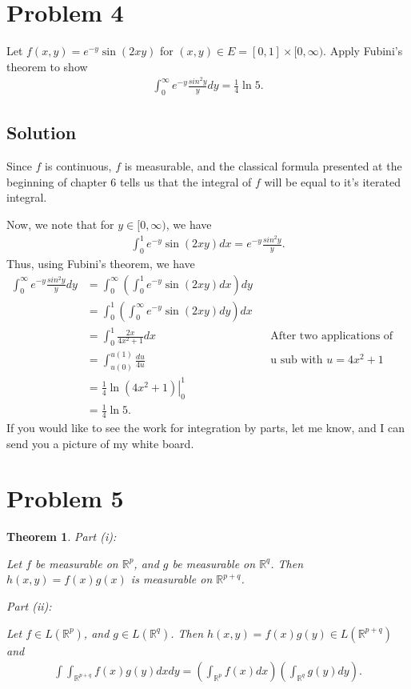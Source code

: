 \documentclass[10pt,a4paper]{article}
\makeatletter
\theoremstyle{theorem}
\newtheorem{theorem}{Theorem}
\newcommand{\proofpart}[2]{%
  \par
  \addvspace{\medskipamount}%
  \noindent\emph{Part #1: #2}\par\nobreak
  \addvspace{\smallskipamount}%
  \@afterheading
}
\theoremstyle{definition}
\makeatother
\begin{document}
\section*{Problem 4}
Let $f(x, y) = e^{-y} \sin(2xy)$ for $(x, y) \in E = [0, 1] \times [0, \infty)$. Apply Fubini's theorem to show
\begin{align*}
\int_0^\infty e^{-y} \frac{sin^2 y}{y} dy = \frac{1}{4} \ln 5.
\end{align*}

\subsection*{Solution}
Since $f$ is continuous, $f$ is measurable, and the classical formula presented at the beginning of chapter 6 tells us that the integral of $f$ will be equal to it's iterated integral.

Now, we note that for $y \in [0, \infty)$, we have
\begin{align*}
\int_0^1 e^{-y} \sin(2xy) dx = e^{-y} \frac{sin^2 y}{y}.
\end{align*}
Thus, using Fubini's theorem, we have
\begin{align*}
\int_0^\infty e^{-y} \frac{sin^2 y}{y} dy &= \int_0^\infty \left( \int_0^1 e^{-y} \sin(2xy) dx \right) dy\\
&= \int_0^1 \left(\int_0^\infty e^{-y} \sin(2xy) dy \right) dx\\
&= \int_0^1 \frac{2x}{4x^2 + 1} dx && \text{After two applications of integration by parts}\\
&= \int_{u(0)}^{u(1)} \frac{du}{4u} && \text{u sub with } u = 4x^2 + 1\\
&= \left. \frac{1}{4}\ln(4x^2 + 1) \right|_0^1\\
&= \frac{1}{4} \ln 5.
\end{align*}
If you would like to see the work for integration by parts, let me know, and I can send you a picture of my white board.

\section*{Problem 5}
\begin{theorem}
\proofpart{(i)}{} Let $f$ be measurable on $\mathbb{R}^p$, and $g$ be measurable on $\mathbb{R}^q$. Then $h(x, y) = f(x)g(x)$ is measurable on $\mathbb{R}^{p + q}$.

\proofpart{(ii)}{} Let $f \in L(\mathbb{R}^p)$, and $g \in L(\mathbb{R}^q)$. Then $h(x, y) = f(x)g(y) \in L(\mathbb{R}^{p + q})$ and 
\begin{align*}
\int \int_{\mathbb{R}^{p + q}} f(x)g(y) dx dy = \left(\int_{\mathbb{R}^{p}} f(x) dx\right) \left( \int_{\mathbb{R}^{q}} g(y) dy \right).
\end{align*}
\end{theorem}
\end{document}
